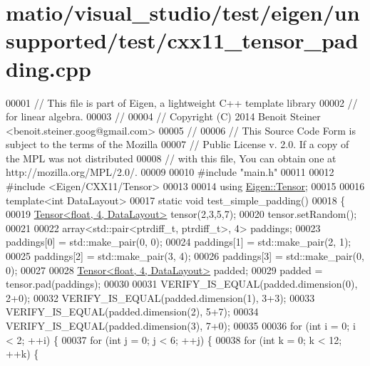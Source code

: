 \hypertarget{matio_2visual__studio_2test_2eigen_2unsupported_2test_2cxx11__tensor__padding_8cpp_source}{}\section{matio/visual\+\_\+studio/test/eigen/unsupported/test/cxx11\+\_\+tensor\+\_\+padding.cpp}
\label{matio_2visual__studio_2test_2eigen_2unsupported_2test_2cxx11__tensor__padding_8cpp_source}

\begin{DoxyCode}
00001 \textcolor{comment}{// This file is part of Eigen, a lightweight C++ template library}
00002 \textcolor{comment}{// for linear algebra.}
00003 \textcolor{comment}{//}
00004 \textcolor{comment}{// Copyright (C) 2014 Benoit Steiner <benoit.steiner.goog@gmail.com>}
00005 \textcolor{comment}{//}
00006 \textcolor{comment}{// This Source Code Form is subject to the terms of the Mozilla}
00007 \textcolor{comment}{// Public License v. 2.0. If a copy of the MPL was not distributed}
00008 \textcolor{comment}{// with this file, You can obtain one at http://mozilla.org/MPL/2.0/.}
00009 
00010 \textcolor{preprocessor}{#include "main.h"}
00011 
00012 \textcolor{preprocessor}{#include <Eigen/CXX11/Tensor>}
00013 
00014 \textcolor{keyword}{using} \hyperlink{class_eigen_1_1_tensor}{Eigen::Tensor};
00015 
00016 \textcolor{keyword}{template}<\textcolor{keywordtype}{int} DataLayout>
00017 \textcolor{keyword}{static} \textcolor{keywordtype}{void} test\_simple\_padding()
00018 \{
00019   \hyperlink{class_eigen_1_1_tensor}{Tensor<float, 4, DataLayout>} tensor(2,3,5,7);
00020   tensor.setRandom();
00021 
00022   array<std::pair<ptrdiff\_t, ptrdiff\_t>, 4> paddings;
00023   paddings[0] = std::make\_pair(0, 0);
00024   paddings[1] = std::make\_pair(2, 1);
00025   paddings[2] = std::make\_pair(3, 4);
00026   paddings[3] = std::make\_pair(0, 0);
00027 
00028   \hyperlink{class_eigen_1_1_tensor}{Tensor<float, 4, DataLayout>} padded;
00029   padded = tensor.pad(paddings);
00030 
00031   VERIFY\_IS\_EQUAL(padded.dimension(0), 2+0);
00032   VERIFY\_IS\_EQUAL(padded.dimension(1), 3+3);
00033   VERIFY\_IS\_EQUAL(padded.dimension(2), 5+7);
00034   VERIFY\_IS\_EQUAL(padded.dimension(3), 7+0);
00035 
00036   \textcolor{keywordflow}{for} (\textcolor{keywordtype}{int} i = 0; i < 2; ++i) \{
00037     \textcolor{keywordflow}{for} (\textcolor{keywordtype}{int} j = 0; j < 6; ++j) \{
00038       \textcolor{keywordflow}{for} (\textcolor{keywordtype}{int} k = 0; k < 12; ++k) \{

\end{DoxyCode}
